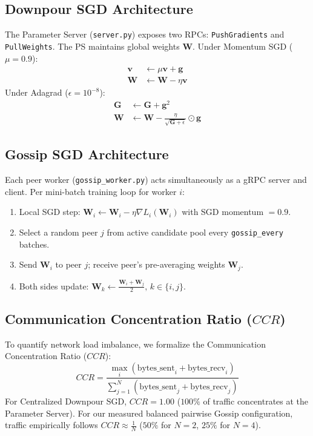 \documentclass[conference]{IEEEtran}
\begin{document}
\subsection{Downpour SGD Architecture}
The Parameter Server (\texttt{server.py}) exposes two RPCs: \texttt{PushGradients} and \texttt{PullWeights}. The PS maintains global weights $\mathbf{W}$. Under Momentum SGD ($\mu=0.9$):
\begin{align}
    \mathbf{v} &\leftarrow \mu \mathbf{v} + \mathbf{g} \\
    \mathbf{W} &\leftarrow \mathbf{W} - \eta \mathbf{v}
\end{align}
Under Adagrad ($\epsilon=10^{-8}$):
\begin{align}
    \mathbf{G} &\leftarrow \mathbf{G} + \mathbf{g}^2 \\
    \mathbf{W} &\leftarrow \mathbf{W} - \frac{\eta}{\sqrt{\mathbf{G} + \epsilon}} \odot \mathbf{g}
\end{align}

\subsection{Gossip SGD Architecture}
Each peer worker (\texttt{gossip\_worker.py}) acts simultaneously as a gRPC server and client. Per mini-batch training loop for worker $i$:
\begin{enumerate}
    \item Local SGD step: $\mathbf{W}_i \leftarrow \mathbf{W}_i - \eta \nabla L_i(\mathbf{W}_i)$ with SGD momentum $= 0.9$.
    \item Select a random peer $j$ from active candidate pool every \texttt{gossip\_every} batches.
    \item Send $\mathbf{W}_i$ to peer $j$; receive peer's pre-averaging weights $\mathbf{W}_j$.
    \item Both sides update: $\mathbf{W}_k \leftarrow \frac{\mathbf{W}_i + \mathbf{W}_j}{2}, \, k \in \{i, j\}$.
\end{enumerate}

\subsection{Communication Concentration Ratio ($CCR$)}
To quantify network load imbalance, we formalize the Communication Concentration Ratio ($CCR$):
\begin{equation}
    CCR = \frac{\max_i (\text{bytes\_sent}_i + \text{bytes\_recv}_i)}{\sum_{j=1}^N (\text{bytes\_sent}_j + \text{bytes\_recv}_j)}
\end{equation}
For Centralized Downpour SGD, $CCR = 1.00$ ($100\%$ of traffic concentrates at the Parameter Server). For our measured balanced pairwise Gossip configuration, traffic empirically follows $CCR \approx \frac{1}{N}$ ($50\%$ for $N=2$, $25\%$ for $N=4$).
\end{document}
